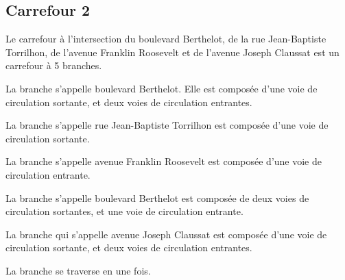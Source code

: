 \begin{appendix}
\newpar{}

  

\newpar{}


\subsection*{Carrefour 2}

\label{annexe:q_ID52_carrefour2}

Le carrefour à l'intersection du boulevard Berthelot, de la rue Jean-Baptiste Torrilhon, de l'avenue Franklin Roosevelt et de l'avenue Joseph Claussat est un carrefour à 5 branches.


\newpar{}

La branche  s'appelle boulevard Berthelot. Elle est composée d'une voie de circulation sortante, et deux voies de circulation entrantes.

\newpar{}

La branche  s'appelle rue Jean-Baptiste Torrilhon est composée d'une voie de circulation sortante.

\newpar{}

La branche  s'appelle avenue Franklin Roosevelt est composée d'une voie de circulation entrante.

\newpar{}

La branche  s'appelle boulevard Berthelot est composée de deux voies de circulation sortantes, et une voie de circulation entrante.

\newpar{}

La branche  qui s'appelle avenue Joseph Claussat est composée d'une voie de circulation sortante, et deux voies de circulation entrantes.

\newpar{}


\newpar{}

La branche  se traverse en une fois.  


\end{appendix}
